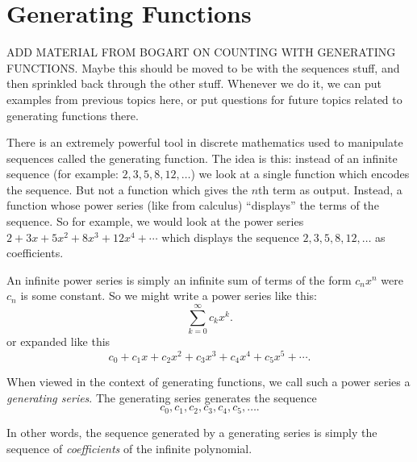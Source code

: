 \documentclass[10pt,]{book}
\theoremstyle{plain}
\theoremstyle{definition}
\theoremstyle{definition}
\theoremstyle{definition}
\theoremstyle{definition}
\numberwithin{equation}{chapter}
\begin{document}
\section[{Generating Functions}]{Generating Functions}\label{section-12}
\hypertarget{p-1058}{}%
ADD MATERIAL FROM BOGART ON COUNTING WITH GENERATING FUNCTIONS. Maybe this should be moved to be with the sequences stuff, and then sprinkled back through the other stuff.  Whenever we do it, we can put examples from previous topics here, or put questions for future topics related to generating functions there.%
\par
\hypertarget{p-1059}{}%
There is an extremely powerful tool in discrete mathematics used to manipulate sequences called the generating function. The idea is this: instead of an infinite sequence (for example: \(2, 3, 5, 8, 12, \ldots\)) we look at a single function which encodes the sequence. But not a function which gives the \(n\)th term as output. Instead, a function whose power series (like from calculus) ``displays'' the terms of the sequence. So for example, we would look at the power series \(2 + 3x + 5x^2 + 8x^3 + 12x^4 + \cdots\) which displays the sequence \(2, 3, 5, 8, 12, \ldots\) as coefficients.%
\par
\hypertarget{p-1060}{}%
An infinite power series is simply an infinite sum of terms of the form \(c_nx^n\) were \(c_n\) is some constant. So we might write a power series like this:%
\begin{equation*}
\sum_{k=0}^\infty c_k x^k.
\end{equation*}
or expanded like this%
\begin{equation*}
c_0 + c_1x + c_2x^2 + c_3x^3 + c_4x^4 + c_5x^5 + \cdots.
\end{equation*}
%
\par
\hypertarget{p-1061}{}%
When viewed in the context of generating functions, we call such a power series a \emph{generating series}. The generating series generates the sequence%
\begin{equation*}
c_0, c_1, c_2, c_3, c_4, c_5, \ldots.
\end{equation*}
%
\par
\hypertarget{p-1062}{}%
In other words, the sequence generated by a generating series is simply the sequence of \emph{coefficients} of the infinite polynomial.%
\end{document}
